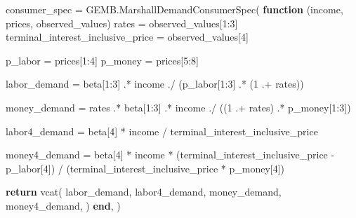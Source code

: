 \documentclass[
  letterpaper,
  DIV=11,
  numbers=noendperiod]{scrreprt}
\newenvironment{Shaded}{\begin{snugshade}}{\end{snugshade}}
\newcommand{\ControlFlowTok}[1]{\textcolor[rgb]{0.00,0.23,0.31}{\textbf{#1}}}
\newcommand{\FloatTok}[1]{\textcolor[rgb]{0.68,0.00,0.00}{#1}}
\newcommand{\FunctionTok}[1]{\textcolor[rgb]{0.28,0.35,0.67}{#1}}
\newcommand{\KeywordTok}[1]{\textcolor[rgb]{0.00,0.23,0.31}{\textbf{#1}}}
\newcommand{\NormalTok}[1]{\textcolor[rgb]{0.00,0.23,0.31}{#1}}
\newcommand{\OperatorTok}[1]{\textcolor[rgb]{0.37,0.37,0.37}{#1}}
\begin{document}
\begin{codelisting}
{\begin{Shaded}
\begin{Highlighting}[]
\NormalTok{consumer\_spec }\OperatorTok{=}\NormalTok{ GEMB.}\FunctionTok{MarshallDemandConsumerSpec}\NormalTok{(}
    \KeywordTok{function}\NormalTok{ (income, prices, observed\_values)}
\NormalTok{        rates }\OperatorTok{=}\NormalTok{ observed\_values[}\FloatTok{1}\OperatorTok{:}\FloatTok{3}\NormalTok{]}
\NormalTok{        terminal\_interest\_inclusive\_price }\OperatorTok{=}\NormalTok{ observed\_values[}\FloatTok{4}\NormalTok{]}

\NormalTok{        p\_labor }\OperatorTok{=}\NormalTok{ prices[}\FloatTok{1}\OperatorTok{:}\FloatTok{4}\NormalTok{]}
\NormalTok{        p\_money }\OperatorTok{=}\NormalTok{ prices[}\FloatTok{5}\OperatorTok{:}\FloatTok{8}\NormalTok{]}

\NormalTok{        labor\_demand }\OperatorTok{=}
\NormalTok{            beta[}\FloatTok{1}\OperatorTok{:}\FloatTok{3}\NormalTok{] }\OperatorTok{.*}\NormalTok{ income }\OperatorTok{./}
\NormalTok{            (p\_labor[}\FloatTok{1}\OperatorTok{:}\FloatTok{3}\NormalTok{] }\OperatorTok{.*}\NormalTok{ (}\FloatTok{1} \OperatorTok{.+}\NormalTok{ rates))}

\NormalTok{        money\_demand }\OperatorTok{=}
\NormalTok{            rates }\OperatorTok{.*}\NormalTok{ beta[}\FloatTok{1}\OperatorTok{:}\FloatTok{3}\NormalTok{] }\OperatorTok{.*}\NormalTok{ income }\OperatorTok{./}
\NormalTok{            ((}\FloatTok{1} \OperatorTok{.+}\NormalTok{ rates) }\OperatorTok{.*}\NormalTok{ p\_money[}\FloatTok{1}\OperatorTok{:}\FloatTok{3}\NormalTok{])}

\NormalTok{        labor4\_demand }\OperatorTok{=}
\NormalTok{            beta[}\FloatTok{4}\NormalTok{] }\OperatorTok{*}\NormalTok{ income }\OperatorTok{/}\NormalTok{ terminal\_interest\_inclusive\_price}

\NormalTok{        money4\_demand }\OperatorTok{=}
\NormalTok{            beta[}\FloatTok{4}\NormalTok{] }\OperatorTok{*}\NormalTok{ income }\OperatorTok{*}
\NormalTok{            (terminal\_interest\_inclusive\_price }\OperatorTok{{-}}\NormalTok{ p\_labor[}\FloatTok{4}\NormalTok{]) }\OperatorTok{/}
\NormalTok{            (terminal\_interest\_inclusive\_price }\OperatorTok{*}\NormalTok{ p\_money[}\FloatTok{4}\NormalTok{])}

        \ControlFlowTok{return} \FunctionTok{vcat}\NormalTok{(}
\NormalTok{            labor\_demand,}
\NormalTok{            labor4\_demand,}
\NormalTok{            money\_demand,}
\NormalTok{            money4\_demand,}
\NormalTok{        )}
    \KeywordTok{end}\NormalTok{,}
\NormalTok{)}


\end{Highlighting}
\end{Shaded}}
\end{codelisting}
\end{document}
